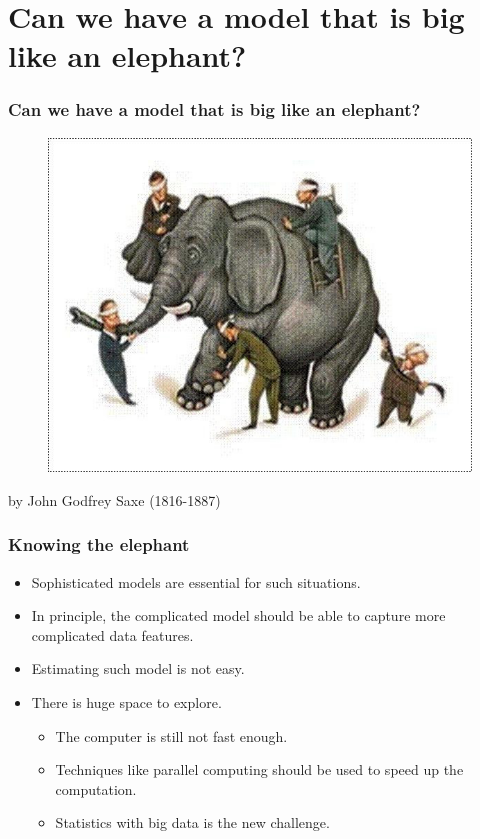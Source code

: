 \documentclass[10pt]{beamer}
\begin{document}
\section{Can we have a model that is big like an elephant?}

\begin{frame}
  \frametitle{Can we have a model that is big like an elephant?}

      \begin{figure}
        \centering
        \includegraphics[height=0.8\textheight]{elephant}
      \end{figure}
\tiny{by John Godfrey Saxe (1816-1887)}
\end{frame}


\begin{frame}
  \frametitle{Knowing the elephant}

  \begin{itemize}
  \item Sophisticated models are essential for such situations.
  \item In principle, the complicated model should be able to capture more
    complicated data features.
  \item Estimating such model is not easy.
  \item There is huge space to explore.
    \begin{itemize}
    \item The computer is still not fast enough.
    \item Techniques like parallel
      computing should be used to speed up the computation.
    \item Statistics with big data is the new challenge.
    \end{itemize}
  \end{itemize}
\end{frame}
\end{document}
